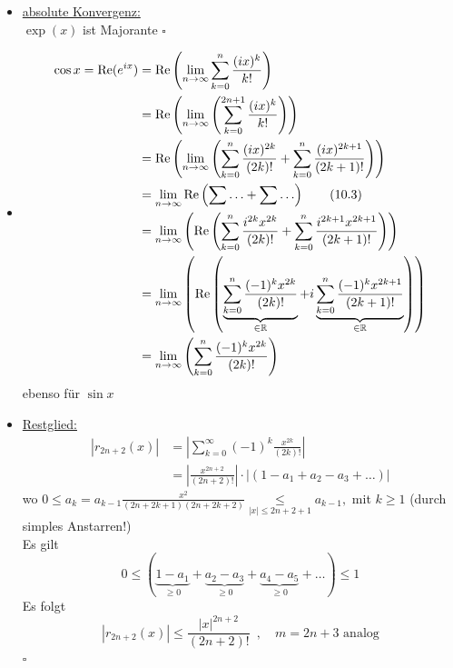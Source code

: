 \begin{itemize}
	\item \underline{absolute Konvergenz:} \\
	$\exp (x)$ ist Majorante \hfill \( \square \)
	\item 
	\begin{align*}
		\cos x = \operatorname{Re}(e^{ix}) &= \operatorname{Re} \left(\lim\limits_{n \to \infty} \sum\limits_{k=0}^{n} \frac{(ix)^k}{k!} \right) \\
		&= \operatorname{Re} \left( \lim\limits_{n \to \infty}  \left( \sum\limits_{k=0}^{2n+1} \frac{ (ix)^k}{k!} \right) \right) \\
		&= \operatorname{Re} \left(\lim\limits_{n \to \infty}  \left( \sum\limits_{k=0}^{n} \frac{(ix)^{2k}}{(2k)!} +
		 \sum\limits_{k=0}^{n} \frac{(ix)^{2k+1}}{(2k+1)!}    \right)\right) \\
		&= \lim\limits_{n \to \infty} \operatorname{Re} \left(\sum \ldots + \sum \ldots \right)  \tag{10.3} \\
		&= \lim\limits_{n \to \infty} \left( \operatorname{Re} \left( \sum\limits_{k=0}^{n} \frac{i^{2k} x^{2k}}{(2k)!} +
		\sum\limits_{k=0}^{n} \frac{i^{2k+1} x^{2k+1}}{(2k+1)!}    \right) \right) \\
		&= \lim\limits_{n \to \infty} \left(\operatorname{Re} \left( \underbrace{\sum\limits_{k=0}^{n} \frac{(-1)^k x^{2k}}{(2k)!}}_{\in \mathbb{R}} + 
				i \underbrace{\sum\limits_{k=0}^{n} \frac{(-1)^k x^{2k+1}}{(2k+1)!}}_{\in \mathbb{R}}    \right) \right) \\
		&= \lim\limits_{n \to \infty} \left( \sum\limits_{k=0}^{n} \frac{(-1)^k x^{2k}}{(2k)!}  \right) 
	\end{align*}
	ebenso für $\sin x$
	\item \underline{Restglied:} \\
	\begin{align*}
		|r_{2n+2} (x)| &= \left| \sum\limits_{k=0}^{\infty} (-1)^k \frac{x^{2k}}{(2k)!} \right| \\
		&= \left| \frac{x^{2n+2}}{(2n+2)!} \right| \cdot  | ( 1 - a_1 + a_2 - a_3 + \ldots ) |  
	\end{align*}
	wo $0 \le a_k = a_{k-1} \frac{x^2}{(2n + 2k +1)(2n+2k+2)} \underset{|x| \le 2n+2+1}{\le} a_{k-1}, $ mit $k\ge 1$ (durch simples Anstarren!)
	\vspace{10pt} \\
	Es gilt
	\[
		 0 \le (\underbrace{1- a_1}_{\ge 0} + \underbrace{a_2- a_3}_{\ge 0} + \underbrace{a_4 - a_5}_{\ge 0} + \ldots ) \le 1
	\]
	Es folgt
	\[
		| r_{2n+2}(x) | \le \frac{|x|^{2n+2}}{(2n+2)!} \enspace , \quad m=2n+3 \text{ analog} 
	\]
	\hfill \( \square \)
\end{itemize}

